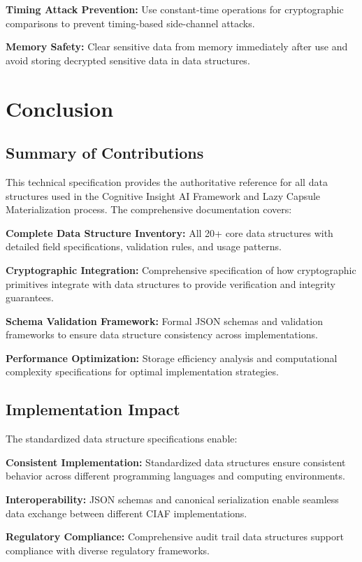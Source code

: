 \documentclass[12pt,a4paper]{article}
\begin{document}
\textbf{Timing Attack Prevention:} Use constant-time operations for cryptographic comparisons to prevent timing-based side-channel attacks.

\textbf{Memory Safety:} Clear sensitive data from memory immediately after use and avoid storing decrypted sensitive data in data structures.

\section{Conclusion}

\subsection{Summary of Contributions}

This technical specification provides the authoritative reference for all data structures used in the Cognitive Insight AI Framework and Lazy Capsule Materialization process. The comprehensive documentation covers:

\textbf{Complete Data Structure Inventory:} All 20+ core data structures with detailed field specifications, validation rules, and usage patterns.

\textbf{Cryptographic Integration:} Comprehensive specification of how cryptographic primitives integrate with data structures to provide verification and integrity guarantees.

\textbf{Schema Validation Framework:} Formal JSON schemas and validation frameworks to ensure data structure consistency across implementations.

\textbf{Performance Optimization:} Storage efficiency analysis and computational complexity specifications for optimal implementation strategies.

\subsection{Implementation Impact}

The standardized data structure specifications enable:

\textbf{Consistent Implementation:} Standardized data structures ensure consistent behavior across different programming languages and computing environments.

\textbf{Interoperability:} JSON schemas and canonical serialization enable seamless data exchange between different CIAF implementations.

\textbf{Regulatory Compliance:} Comprehensive audit trail data structures support compliance with diverse regulatory frameworks.
\end{document}
